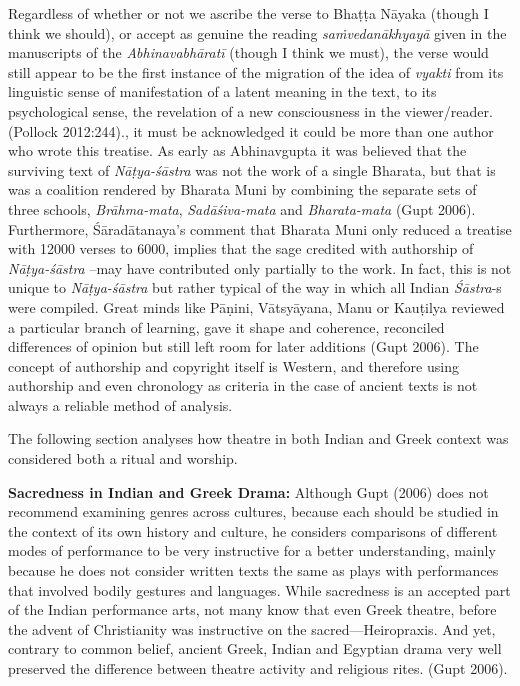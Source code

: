 {Regardless of whether or not we ascribe the verse to Bhaṭṭa Nāyaka (though I think we should), or accept as genuine the reading \textsl{saṁvedanākhyayā} given in the manuscripts of the \textsl{Abhinavabhāratī} (though I think we must), the verse would still appear to be the first instance of the migration of the idea of \textsl{vyakti} from its linguistic sense of manifestation of a latent meaning in the text, to its psychological sense, the revelation of a new consciousness in the viewer/reader. (Pollock 2012:244).}, it must be acknowledged it could be more than one author who wrote this treatise. As early as Abhinavgupta it was believed that the surviving text of \textsl{Nāṭya-śāstra} was not the work of a single Bharata, but that is was a coalition rendered by Bharata Muni by combining the separate sets of three schools, \textsl{Brāhma-mata}, \textsl{Sadāśiva-mata} and \textsl{Bharata-mata} (Gupt 2006). Furthermore, Śāradātanaya’s comment that Bharata Muni only reduced a treatise with 12000 verses to 6000, implies that the sage credited with authorship of \textsl{Nāṭya-śāstra} --may have contributed only partially to the work. In fact, this is not unique to \textsl{Nāṭya-śāstra} but rather typical of the way in which all Indian \textsl{Śāstra}-s were compiled. Great minds like Pāṇini, Vātsyāyana, Manu or Kauṭilya reviewed a particular branch of learning, gave it shape and coherence, reconciled differences of opinion but still left room for later additions (Gupt 2006). The concept of authorship and copyright itself is Western, and therefore using authorship and even chronology as criteria in the case of ancient texts is not always a reliable method of analysis. 

The following section analyses how theatre in both Indian and Greek context was considered both a ritual and worship. 

\textbf{Sacredness in Indian and Greek Drama:} Although Gupt (2006) does not recommend examining genres across cultures, because each should be studied in the context of its own history and culture, he considers comparisons of different modes of performance to be very instructive for a better understanding, mainly because he does not consider written texts the same as plays with performances that involved bodily gestures and languages. While sacredness is an accepted part of the Indian performance arts, not many know that even Greek theatre, before the advent of Christianity was instructive on the sacred---Heiropraxis. And yet, contrary to common belief, ancient Greek, Indian and Egyptian drama very well preserved the difference between theatre activity and religious rites. (Gupt 2006).

